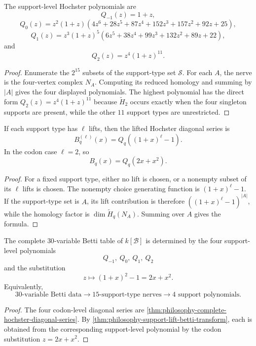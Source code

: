 \begin{theorem}
\label{thm:philosophy-support-level-betti-polynomials}
The support-level Hochster polynomials are
$$
  Q_{-1}(z)=1+z,
$$
$$
  Q_{0}(z)
  =
  z^{2}(1+z)
  \left(
  4z^{6}+28z^{5}+87z^{4}+152z^{3}
  +157z^{2}+92z+25
  \right),
$$
$$
  Q_{1}(z)
  =
  z^{3}(1+z)^{5}
  \left(
  6z^{5}+38z^{4}+99z^{3}+132z^{2}+89z+22
  \right),
$$
and
$$
  Q_{2}(z)=z^{4}(1+z)^{11}.
$$
\end{theorem}
\begin{proof}
Enumerate the $2^{15}$ subsets of the support-type set
$\mathcal{S}$. For each $A$, the nerve is the four-vertex complex
$N_{A}$. Computing its reduced homology and summing by $|A|$ gives the
four displayed polynomials. The highest polynomial has the direct
form $Q_{2}(z)=z^{4}(1+z)^{11}$ because $\widetilde{H}_{2}$ occurs
exactly when the four singleton supports are present, while the other
$11$ support types are unrestricted.
\end{proof}

\begin{theorem}
\label{thm:philosophy-support-lift-betti-transform}
If each support type has $\ell$ lifts, then the lifted Hochster
diagonal series is
$$
  B_{q}^{(\ell)}(x)
  =
  Q_{q}\left((1+x)^{\ell}-1\right).
$$
In the codon case $\ell=2$, so
$$
  B_{q}(x)=Q_{q}(2x+x^{2}).
$$
\end{theorem}
\begin{proof}
For a fixed support type, either no lift is chosen, or a nonempty
subset of its $\ell$ lifts is chosen. The nonempty choice generating
function is $(1+x)^{\ell}-1$. If the support-type set is $A$, its lift
contribution is therefore $\left((1+x)^{\ell}-1\right)^{|A|}$, while
the homology factor is $\dim\widetilde{H}_{q}(N_{A})$. Summing over
$A$ gives the formula.
\end{proof}

\begin{corollary}
\label{cor:philosophy-codon-support-lift-compression}
The complete $30$-variable Betti table of $k[\mathcal{B}]$ is
determined by the four support-level polynomials
$$
  Q_{-1},\ Q_{0},\ Q_{1},\ Q_{2}
$$
and the substitution
$$
  z\mapsto (1+x)^{2}-1=2x+x^{2}.
$$
Equivalently,
$$
  30\text{-variable Betti data}
  \longrightarrow
  15\text{-support-type nerves}
  \longrightarrow
  4\text{ support polynomials}.
$$
\end{corollary}
\begin{proof}
The four codon-level diagonal series are
\autoref{thm:philosophy-complete-hochster-diagonal-series}. By
\autoref{thm:philosophy-support-lift-betti-transform}, each is obtained
from the corresponding support-level polynomial by the codon
substitution $z=2x+x^{2}$.
\end{proof}

